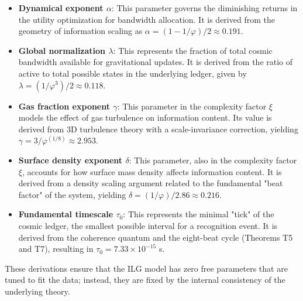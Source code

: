 \documentclass[12pt,a4paper]{article}
\begin{document}
\begin{itemize}
    \item \textbf{Dynamical exponent $\alpha$}: This parameter governs the diminishing returns in the utility optimization for bandwidth allocation. It is derived from the geometry of information scaling as $\alpha = (1-1/\varphi)/2 \approx 0.191$.
    
    \item \textbf{Global normalization $\lambda$}: This represents the fraction of total cosmic bandwidth available for gravitational updates. It is derived from the ratio of active to total possible states in the underlying ledger, given by $\lambda = (1/\varphi^3)/2 \approx 0.118$.
    
    \item \textbf{Gas fraction exponent $\gamma$}: This parameter in the complexity factor $\xi$ models the effect of gas turbulence on information content. Its value is derived from 3D turbulence theory with a scale-invariance correction, yielding $\gamma = 3/\varphi^{(1/8)} \approx 2.953$.
    
    \item \textbf{Surface density exponent $\delta$}: This parameter, also in the complexity factor $\xi$, accounts for how surface mass density affects information content. It is derived from a density scaling argument related to the fundamental "beat factor" of the system, yielding $\delta = (1/\varphi)/2.86 \approx 0.216$.
    
    \item \textbf{Fundamental timescale $\tau_0$}: This represents the minimal "tick" of the cosmic ledger, the smallest possible interval for a recognition event. It is derived from the coherence quantum and the eight-beat cycle (Theorems T5 and T7), resulting in $\tau_0 = 7.33 \times 10^{-15}$ s.
\end{itemize}

These derivations ensure that the ILG model has zero free parameters that are tuned to fit the data; instead, they are fixed by the internal consistency of the underlying theory.
\end{document}
